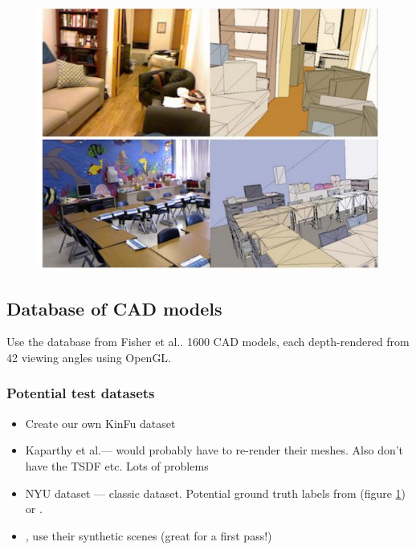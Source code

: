 \documentclass[10pt,twocolumn,letterpaper]{article}
\makeatletter
\newcommand*{\ea}{et al.\@\xspace}
\makeatother
\begin{document}
\begin{figure}
    \centering%
    \includegraphics[width=1.0\columnwidth]{guo.png}%
    \label{fig:guo_labels}%
\end{figure}


\subsection{Database of CAD models}
Use the database from Fisher \ea \cite{fisher-siggraphasia-2012}.
1600 CAD models, each depth-rendered from 42 viewing angles using OpenGL.

\subsubsection{Potential test datasets}
\begin{itemize}
\item Create our own KinFu dataset
\item Kaparthy \ea --- would probably have to re-render their meshes.
Also don't have the TSDF etc. Lots of problems
\item NYU dataset --- classic dataset. Potential ground truth labels from \cite{guo-iccv-2013} (figure \ref{fig:guo_labels}) or \cite{kim-iccv-2013}.
\item \cite{fisher-siggraphasia-2012}, use their synthetic scenes (great for a first pass!)
\end{itemize}
\end{document}
